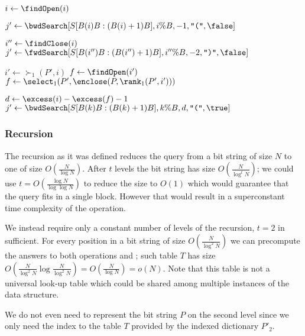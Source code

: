 \begin{algorithm}
\begin{algorithmic}
		\State $i \gets \findOpen(i)$
	\EndIf

	\State $j' \gets \bwdSearch[S[B(i)B : (B(i)+1) B], i \% B, -1, \openingParen, \false]$
		\State {} 
	\EndIf
	
	\State $i'' \gets \findClose(i)$
	\State $j' \gets \fwdSearch[S[B(i'')B : (B(i'')+1) B], i'' \% B, -2, \closingParen, \false]$
		\State {} 
	\EndIf
	
	\State

	\State $i' \gets \succ_1(P', i)$
		\State $f \gets \findOpen(i')$
	\Else
		\State $f \gets \select_1(P', \enclose(P, \rank_1(P', i')))$ 
	\EndIf
	
	\State $d \gets \excess(i) - \excess(f) - 1$
	\State $j' \gets \bwdSearch[S[B(k)B: (B(k) + 1)B], k \% B, d, \openingParen, \true]$
	\State {}
\EndFunction
\end{algorithmic}
\end{algorithm}

\subsubsection{Recursion}

The recursion as it was defined reduces the query from a bit string of size $N$ to one of size $O(\frac{N}{\log N})$.
After $t$ levels the bit string has size $O(\frac{N}{\log^t N})$; we could use $t = O(\frac{\log N}{\log\log N})$ to reduce the size to $O(1)$ which would guarantee that the query fits in a single block.
However that would result in a superconstant time complexity of the operation.

We instead require only a constant number of levels of the recursion, $t = 2$ in sufficient.
For every position in a bit string of size $O(\frac{N}{\log^2 N})$ we can precompute the answers to both operations \match{} and \enclose{}; such table $T$ has size $O(\frac{N}{\log^2 N} \log \frac{N}{\log^2 N}) = O(\frac{N}{\log N}) = o(N)$.
Note that this table is not a universal look-up table which could be shared among multiple instances of the data structure.

We do not even need to represent the bit string $P$ on the second level since we only need the index to the table $T$ provided by the indexed dictionary $P'_2$.

